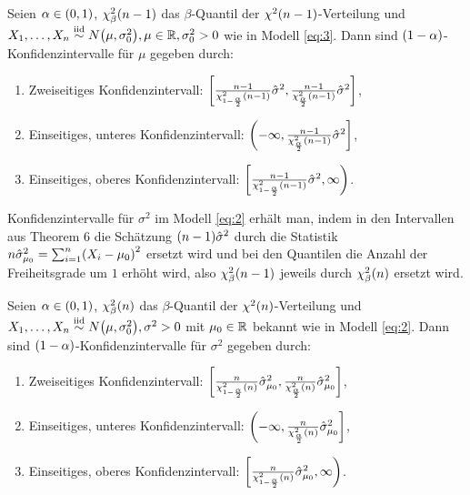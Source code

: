 \documentclass{lecture}
\begin{document}
    \begin{theorem}
        Seien \(\alpha \in \parentheses*{0, 1}\), \(\chi_\beta^2\parentheses*{n - 1}\) das \(\beta\)-Quantil der \(\chi^2\parentheses*{n - 1}\)-Verteilung und \(X_1, \ldots, X_n \stackrel{\text{iid}}{\sim} N\parentheses*{\mu, \sigma_0^2}, \mu \in \R, \sigma_0^2 > 0\) wie in Modell \eqref{eq:3}.
        Dann sind \(\parentheses*{1 - \alpha}\)-Konfidenzintervalle für \(\mu\) gegeben durch:
        \begin{enumerate}
            \item Zweiseitiges Konfidenzintervall: \(\brackets*{\frac{n - 1}{\chi_{1 - \frac{\alpha}{2}}^2\parentheses*{n - 1}}\hat{\sigma}^2, \frac{n - 1}{\chi_{\frac{\alpha}{2}}^2\parentheses*{n - 1}}\hat{\sigma}^2}\),
            \item Einseitiges, unteres Konfidenzintervall: \(\left(-\infty, \frac{n - 1}{\chi_{\frac{\alpha}{2}}^2\parentheses*{n - 1}}\hat{\sigma}^2\right]\),
            \item Einseitiges, oberes Konfidenzintervall: \(\left[\frac{n - 1}{\chi_{1 - \frac{\alpha}{2}}^2\parentheses*{n - 1}}\hat{\sigma}^2, \infty\right)\).
        \end{enumerate}
    \end{theorem}

    Konfidenzintervalle für \(\sigma^2\) im Modell \eqref{eq:2} erhält man, indem in den Intervallen aus Theorem 6 die Schätzung \(\parentheses*{n - 1}\hat{\sigma}^2\) durch die Statistik \(n\hat{\sigma}_{\mu_0}^2 = \sum_{i = 1}^n \parentheses*{X_i - \mu_0}^2\) ersetzt wird und bei den Quantilen die Anzahl der Freiheitsgrade um \(1\) erhöht wird, also \(\chi_\beta^2\parentheses*{n - 1}\) jeweils durch \(\chi_\beta^2\parentheses*{n}\) ersetzt wird.

    \begin{theorem}
        Seien \(\alpha \in \parentheses*{0, 1}\), \(\chi_\beta^2\parentheses*{n}\) das \(\beta\)-Quantil der \(\chi^2\parentheses*{n}\)-Verteilung und \(X_1, \ldots, X_n \stackrel{\text{iid}}{\sim} N\parentheses*{\mu, \sigma_0^2}, \sigma^2 > 0\) mit \(\mu_0 \in \R\) bekannt wie in Modell \eqref{eq:2}.
        Dann sind \(\parentheses*{1 - \alpha}\)-Konfidenzintervalle für \(\sigma^2\) gegeben durch:
        \begin{enumerate}
            \item Zweiseitiges Konfidenzintervall: \(\brackets*{\frac{n}{\chi_{1 - \frac{\alpha}{2}}^2\parentheses*{n}}\hat{\sigma}_{\mu_0}^2, \frac{n}{\chi_{\frac{\alpha}{2}}^2\parentheses*{n}}\hat{\sigma}_{\mu_0}^2}\),
            \item Einseitiges, unteres Konfidenzintervall: \(\left(-\infty, \frac{n}{\chi_{\frac{\alpha}{2}}^2\parentheses*{n}}\hat{\sigma}_{\mu_0}^2\right]\),
            \item Einseitiges, oberes Konfidenzintervall: \(\left[\frac{n}{\chi_{1 - \frac{\alpha}{2}}^2\parentheses*{n}}\hat{\sigma}_{\mu_0}^2, \infty\right)\).
        \end{enumerate}
    \end{theorem}
\end{document}
